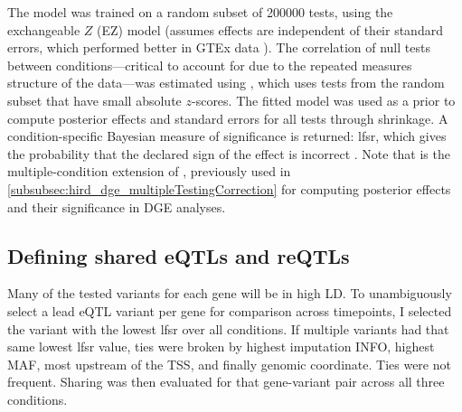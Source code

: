 The  model was trained on a random subset of \num{200000} tests, using the exchangeable $Z$ (EZ) model (assumes effects are independent of their standard errors, which performed better in GTEx data \autocite{urbut2018FlexibleStatisticalMethods}).
The correlation of null tests between conditions---critical to account for due to the repeated measures structure of the data---was estimated using , which uses tests from the random subset that have small absolute $z$-scores.
The fitted model was used as a prior to compute posterior effects and standard errors for all tests through shrinkage.
A condition-specific Bayesian measure of significance is returned:
\gls{lfsr}, which gives the probability that the declared sign of the effect is incorrect \autocite{stephens2016FalseDiscoveryRates}.
Note that  is the multiple-condition extension of  \autocite{stephens2016FalseDiscoveryRates}, 
previously used in \cref{subsubsec:hird_dge_multipleTestingCorrection} for computing posterior effects and their significance in \gls{DGE} analyses.

\subsection{Defining shared eQTLs and reQTLs}
\label{subsec:hird_reQTL_methods_definingSharedAndreQTLs}

Many of the tested variants for each gene will be in high \gls{LD}.
To unambiguously select a lead \gls{eQTL} variant per gene for comparison across timepoints, I selected the variant with the lowest \gls{lfsr} over all conditions.
If multiple variants had that same lowest \gls{lfsr} value,
ties were broken by highest imputation INFO, highest \gls{MAF}, most upstream of the \gls{TSS}, and finally genomic coordinate.
Ties were not frequent.
Sharing was then evaluated for that gene-variant pair across all three conditions.

